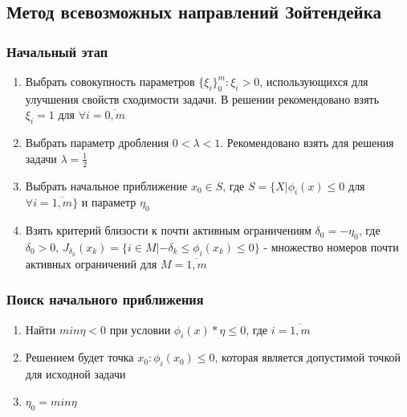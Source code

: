 \documentclass[../body.tex]{subfiles}
\begin{document}
\subsection{Метод всевозможных направлений Зойтендейка}
\subsubsection{Начальный этап}
\begin{enumerate}
    \item Выбрать совокупность параметров $\{\xi_i\}_0^m:\xi_i>0$, использующихся для улучшения свойств сходимости задачи. В решении рекомендовано взять $\xi_i=1$ для $\forall i=\overline{0,m}$
    \item Выбрать параметр дробления $0<\lambda<1$. Рекомендовано взять для решения задачи $\lambda=\frac{1}{2}$
    \item Выбрать начальное приближение $x_0\in S$, где $S=\{X|\phi_i(x)\leq0$ для $\forall i=\overline{1,m}\}$ и параметр $\eta_0$
    \item Взять критерий близости к почти активным ограничениям $\delta_0=-\eta_0$, где $\delta_0>0$, $J_{\delta_k}(x_k)=\{i\in M|-\delta_k\leq\phi_i(x_k)\leq0\}$ - множество номеров почти активных ограничений для $M=\overline{1,m}$
\end{enumerate}

\subsubsection{Поиск начального приближения}
\begin{enumerate}
    \item Найти $min\eta<0$ при условии $\phi_i(x)*\eta\leq0$, где $i=\overline{1,m}$
    \item Решением будет точка $x_0:\phi_i(x_0)\leq0$, которая является допустимой точкой для исходной задачи
    \item $\eta_0=min\eta$
\end{enumerate}
\end{document}
